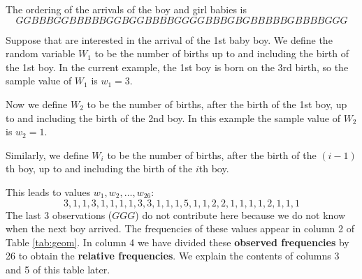 \documentclass[
  british,
  11pt,
  openany, a4paper]{book}
\begin{document}
The ordering of the arrivals of the boy and girl babies is
\[ G G B B B G G B B B B B G G B G G B B B B G G G G B B B G B G B B B B B G B B B B G G G \]

Suppose that are interested in the arrival of the 1st baby boy. We define the random variable \(W_1\) to be the number of births up to and including the birth of the 1st boy. In the current example, the 1st boy is born on the 3rd birth, so the sample value of \(W_1\) is \(w_1=3\).

Now we define \(W_2\) to be the number of births, after the birth of the 1st boy, up to and including the birth of the 2nd boy. In this example the sample value of \(W_2\) is \(w_2=1\).

Similarly, we define \(W_i\) to be the number of births, after the birth of the \((i-1)\)th boy, up to and including the birth of the \(i\)th boy.

This leads to values \(w_1, w_2, \ldots, w_{26}\):
\[ 3, 1, 1, 3, 1, 1, 1, 1, 3, 3, 1, 1, 1, 5, 1, 1, 2, 2, 1, 1, 1, 1, 2, 1, 1, 1 \]
The last 3 observations (\(GGG\)) do not contribute here because we do not know when the next boy arrived. The frequencies of these values appear in column 2 of Table \ref{tab:geom}. In column 4 we have divided these \textbf{observed frequencies} by 26 to obtain the \textbf{relative frequencies}. We explain the contents of columns 3 and 5 of this table later.

 
  \providecommand{\huxb}[2]{\arrayrulecolor[RGB]{#1}\global\arrayrulewidth=#2pt}
  \providecommand{\huxvb}[2]{\color[RGB]{#1}\vrule width #2pt}
  \providecommand{\huxtpad}[1]{\rule{0pt}{#1}}
  \providecommand{\huxbpad}[1]{\rule[-#1]{0pt}{#1}}
\end{document}
